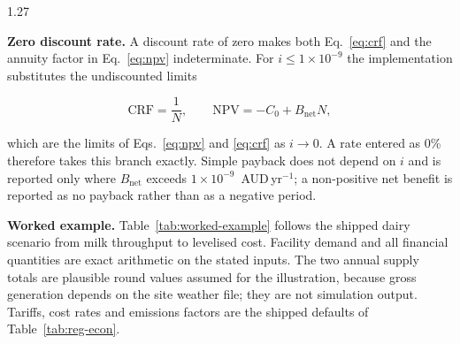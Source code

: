 \documentclass[12pt,letterpaper]{article}
\begin{document}
\begin{spacing}{1.27}
\vspace{0.15in}

\textbf{Zero discount rate.} A discount rate of zero makes both Eq.~\ref{eq:crf} and the annuity factor in Eq.~\ref{eq:npv} indeterminate. For $i \leq 1\times10^{-9}$ the implementation substitutes the undiscounted limits

\begin{equation}
\mathrm{CRF} = \frac{1}{N}, \qquad \mathrm{NPV} = -C_0 + B_{\mathrm{net}}N,
\label{eq:zerodiscount}
\end{equation}

\noindent which are the limits of Eqs.~\ref{eq:npv} and \ref{eq:crf} as $i\rightarrow 0$. A rate entered as 0\% therefore takes this branch exactly. Simple payback does not depend on $i$ and is reported only where $B_{\mathrm{net}}$ exceeds $1\times10^{-9}$~AUD\,yr$^{-1}$; a non-positive net benefit is reported as no payback rather than as a negative period.\par

\vspace{0.15in}

\textbf{Worked example.} Table~\ref{tab:worked-example} follows the shipped dairy scenario from milk throughput to levelised cost. Facility demand and all financial quantities are exact arithmetic on the stated inputs. The two annual supply totals are plausible round values assumed for the illustration, because gross generation depends on the site weather file; they are not simulation output. Tariffs, cost rates and emissions factors are the shipped defaults of Table~\ref{tab:reg-econ}.\par
\end{spacing}

\vspace{0.1in}
\end{document}
